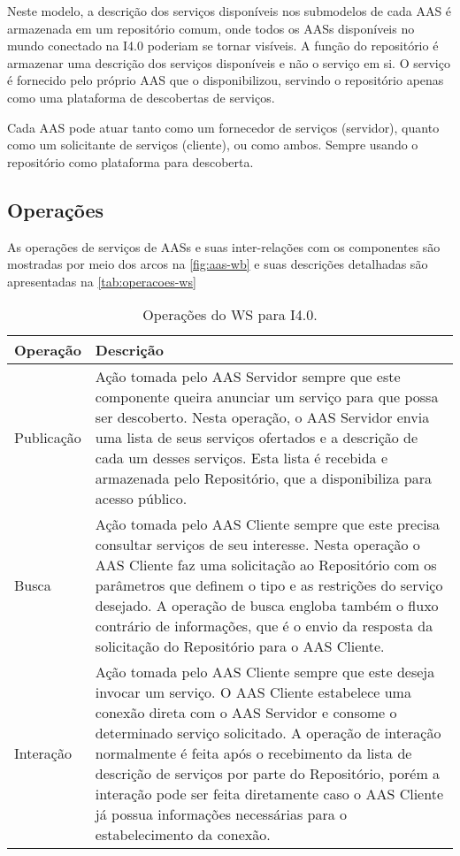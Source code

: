 	Neste modelo, a descrição dos serviços disponíveis nos submodelos de cada AAS é armazenada em um repositório comum, onde todos os AASs disponíveis no mundo conectado na I4.0 poderiam se tornar visíveis. A função do repositório é armazenar uma descrição dos serviços disponíveis e não o serviço em si. O serviço é fornecido pelo próprio AAS que o disponibilizou, servindo o repositório apenas como uma plataforma de descobertas de serviços.

	Cada AAS pode atuar tanto como um fornecedor de serviços (servidor), quanto como um solicitante de serviços (cliente), ou como ambos. Sempre usando o repositório como plataforma para descoberta.

\subsection{Operações}
	As operações de serviços de AASs e suas inter-relações com os componentes são mostradas por meio dos arcos na \autoref{fig:aas-wb} e suas descrições detalhadas são apresentadas na \autoref{tab:operacoes-ws}
	
	\begin{table}[htb]
		\centering
		\caption{Operações do WS para I4.0.}
		\label{tab:operacoes-ws}
		\begin{tabular}{p{3cm}p{12cm}}
			\hline
			\textbf{Operação}
			& \textbf{Descrição} \\ 
			
			\hline
			Publicação
			& Ação tomada pelo AAS Servidor sempre que este componente queira anunciar um serviço para que possa ser descoberto. Nesta operação, o AAS Servidor envia uma lista de seus serviços ofertados e a descrição de cada um desses serviços. Esta lista é recebida e armazenada pelo Repositório, que a disponibiliza para acesso público. \\
			
			\hline
			Busca
			& Ação tomada pelo AAS Cliente sempre que este precisa consultar serviços de seu interesse. Nesta operação o AAS Cliente faz uma solicitação ao Repositório com os parâmetros que definem o tipo e as restrições do serviço desejado. A operação de busca engloba também o fluxo contrário de informações, que é o envio da resposta da solicitação do Repositório para o AAS Cliente. \\
			
			\hline
			Interação
			& Ação tomada pelo AAS Cliente sempre que este deseja invocar um serviço. O AAS Cliente estabelece uma conexão direta com o AAS Servidor e consome o determinado serviço solicitado. A operação de interação normalmente é feita após o recebimento da lista de descrição de serviços por parte do Repositório, porém a interação pode ser feita diretamente caso o AAS Cliente já possua informações necessárias para o estabelecimento da conexão.  \\
			
			\hline
		\end{tabular}
	\end{table}

